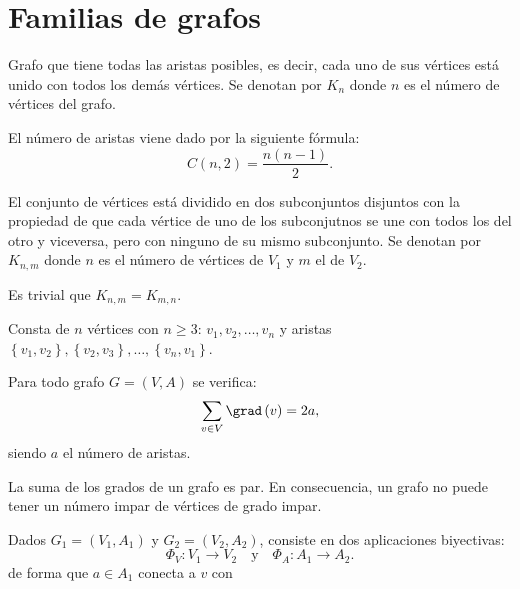 \section{Familias de grafos}
\begin{fdefinition}
\normalfont Grafo que tiene todas las aristas posibles, es decir, cada uno de sus vértices está unido con todos los demás vértices. Se denotan por $\displaystyle K_{n} $ donde $\displaystyle n $ es el número de vértices del grafo.
\end{fdefinition}
\begin{observation}
\normalfont El número de aristas viene dado por la siguiente fórmula:
\[C\left(n,2\right) = \frac{n\left(n-1\right)}{2} .\]
\end{observation}
\begin{fdefinition}
\normalfont El conjunto de vértices está dividido en dos subconjuntos disjuntos con la propiedad de que cada vértice de uno de los subconjutnos se une con todos los del otro y viceversa, pero con ninguno de su mismo subconjunto. Se denotan por $\displaystyle K_{n,m} $ donde $\displaystyle n $ es el número de vértices de $\displaystyle V_{1} $ y $\displaystyle m $ el de $\displaystyle V_{2} $. 
\end{fdefinition}
\begin{observation}
\normalfont Es trivial que $\displaystyle K_{n,m} = K_{m,n} $.
\end{observation}
\begin{fdefinition}[Ciclo]
	\normalfont Consta de $\displaystyle n $ vértices con $\displaystyle n \geq 3 $: $\displaystyle v_{1}, v_{2}, \ldots, v_{n} $ y aristas $\displaystyle \left\{ v_{1}, v_{2}\right\} , \left\{ v_{2}, v_{3}\right\} , \ldots, \left\{ v_{n}, v_{1}\right\}  $. 
\end{fdefinition}
\begin{ftheorem}
\normalfont Para todo grafo $\displaystyle G = \left(V,A\right) $ se verifica:
\[\sum_{v \in V}\grad\left(v\right) = 2a ,\]
siendo $\displaystyle a $ el número de aristas.
\end{ftheorem}
\begin{fcolorary}[]
\normalfont La suma de los grados de un grafo es par. En consecuencia, un grafo no puede tener un número impar de vértices de grado impar.
\end{fcolorary}
\begin{fdefinition}[Isomorfismo]
\normalfont Dados $\displaystyle G_{1} = \left(V_{1}, A_{1}\right) $ y $\displaystyle G_{2} = \left(V_{2}, A_{2}\right) $, consiste en dos aplicaciones biyectivas:
\[\Phi_{V}: V_{1} \to V_{2} \quad \text{y} \quad \Phi_{A} : A_{1} \to A_{2} .\]
de forma que $\displaystyle a \in A_{1} $ conecta a $\displaystyle v $ con 
\end{fdefinition}
